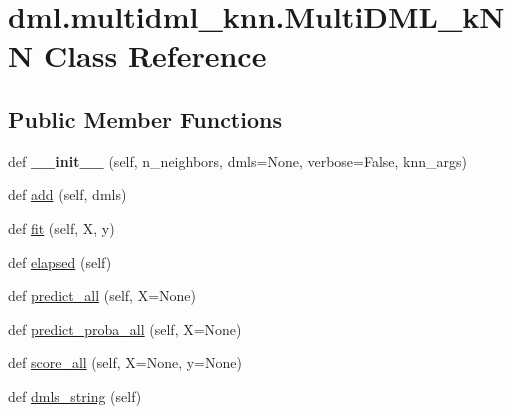 \hypertarget{classdml_1_1multidml__knn_1_1MultiDML__kNN}{}\section{dml.\+multidml\+\_\+knn.\+Multi\+D\+M\+L\+\_\+k\+NN Class Reference}
\label{classdml_1_1multidml__knn_1_1MultiDML__kNN}
\subsection*{Public Member Functions}
\begin{DoxyCompactItemize}
\item 
def {\bfseries \+\_\+\+\_\+init\+\_\+\+\_\+} (self, n\+\_\+neighbors, dmls=None, verbose=False, knn\+\_\+args)\hypertarget{classdml_1_1multidml__knn_1_1MultiDML__kNN_a8539a84676b0b9a554797907b5238069}{}\label{classdml_1_1multidml__knn_1_1MultiDML__kNN_a8539a84676b0b9a554797907b5238069}

\item 
def \hyperlink{classdml_1_1multidml__knn_1_1MultiDML__kNN_a7b980f08da2a002708a7f753a4d07dda}{add} (self, dmls)
\item 
def \hyperlink{classdml_1_1multidml__knn_1_1MultiDML__kNN_a75eeeb787411f911f203ad06ed4c5764}{fit} (self, X, y)
\item 
def \hyperlink{classdml_1_1multidml__knn_1_1MultiDML__kNN_a351feb6aca364a137f8f816cc781ac50}{elapsed} (self)
\item 
def \hyperlink{classdml_1_1multidml__knn_1_1MultiDML__kNN_aa0dcf8938bcddba60f78f63d3314a716}{predict\+\_\+all} (self, X=None)
\item 
def \hyperlink{classdml_1_1multidml__knn_1_1MultiDML__kNN_a623e8af8fb11433d6cb3627e29928d2e}{predict\+\_\+proba\+\_\+all} (self, X=None)
\item 
def \hyperlink{classdml_1_1multidml__knn_1_1MultiDML__kNN_a8f8fcc90ff495bbb5f4f52636244d1aa}{score\+\_\+all} (self, X=None, y=None)
\item 
def \hyperlink{classdml_1_1multidml__knn_1_1MultiDML__kNN_ac475b5d23239fdf0823fe2e4e25c6723}{dmls\+\_\+string} (self)
\end{DoxyCompactItemize}
